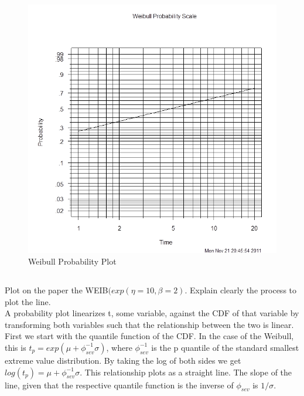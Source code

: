 \documentclass{article}
\begin{document}
\begin{figure}
  \centering
  \includegraphics[width = 5in]{weibull_graph_2.png}
  \caption{Weibull Probability Plot}
\end{figure}
\FloatBarrier

\subsection{}
Plot on the paper the WEIB\begin{math}(exp(\eta = 10, \beta = 2).\end{math}
Explain clearly the process to plot the line.\\

A probability plot linearizes t, some variable, against the CDF of that variable by transforming both variables such that the relationship between the two is linear.  First we start with the quantile function of the CDF.  In the case of the Weibull, this is \(t_p = exp(\mu + \phi_{sev}^{-1} \sigma)\), where \(\phi_{sev}^{-1}\) is the p quantile of the standard smallest extreme value distribution.  By taking the log of both sides we get \(log(t_p) = \mu + \phi_{sev}^{-1} \sigma\).  This relationship plots as a straight line.  The slope of the line, given that the respective quantile function is the inverse of  \(\phi_{sev}\) is \(1/\sigma\).\\
\end{document}
